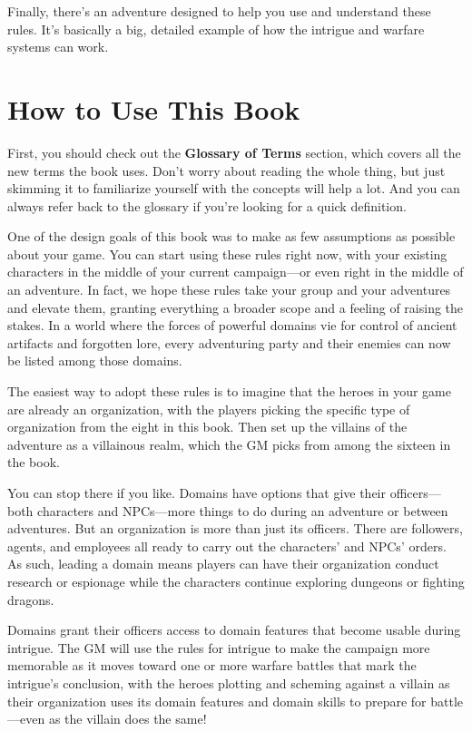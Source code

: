 \documentclass[10pt,a4paper,twoside,bg=print,twocolumn,openany,nodeprecatedcode]{dndbook}
\begin{document}
Finally, there's an adventure designed to help you use and understand these rules. It's basically a big, detailed example of how the intrigue and warfare systems can work.

\section{How to Use This Book}
First, you should check out the \textbf{Glossary of Terms} section, which covers all the new terms the book uses. Don't worry about reading the whole thing, but just skimming it to familiarize yourself with the concepts will help a lot. And you can always refer back to the glossary if you're looking for a quick definition.

One of the design goals of this book was to make as few assumptions as possible about your game. You can start using these rules right now, with your existing characters in the middle of your current campaign—or even right in the middle of an adventure. In fact, we hope these rules take your group and your adventures and elevate them, granting everything a broader scope and a feeling of raising the stakes. In a world where the forces of powerful domains vie for control of ancient artifacts and forgotten lore, every adventuring party and their enemies can now be listed among those domains.

The easiest way to adopt these rules is to imagine that the heroes in your game are already an organization, with the players picking the specific type of organization from the eight in this book. Then set up the villains of the adventure as a villainous realm, which the GM picks from among the sixteen in the book.

You can stop there if you like. Domains have options that give their officers—both characters and NPCs—more things to do during an adventure or between adventures. But an organization is more than just its officers. There are followers, agents, and employees all ready to carry out the characters' and NPCs' orders. As such, leading a domain means players can have their organization conduct research or espionage while the characters continue exploring dungeons or fighting dragons.

Domains grant their officers access to domain features that become usable during intrigue. The GM will use the rules for intrigue to make the campaign more memorable as it moves toward one or more warfare battles that mark the intrigue's conclusion, with the heroes plotting and scheming against a villain as their organization uses its domain features and domain skills to prepare for battle—even as the villain does the same!
\end{document}
